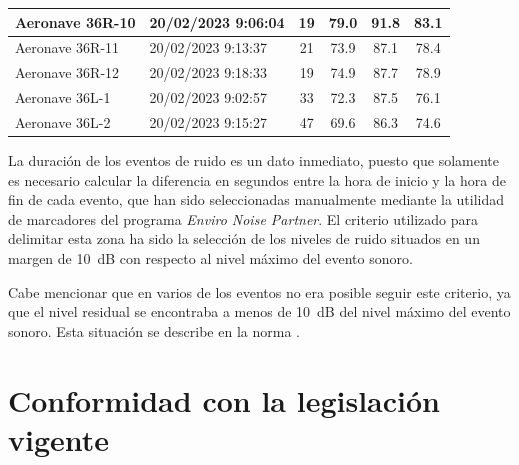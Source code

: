 \documentclass[11pt]{article}
\begin{document}
\begin{table}[htbp]
\begin{tabular}{|l|l|c|c|c|c|}
        \rowcolor[rgb]{ .867,  .922,  .969} Aeronave 36R-10 & 20/02/2023 9:06:04 & 19                 & 79.0        & 91.8     & 83.1       \\ \hline
        \rowcolor[rgb]{ .867,  .922,  .969} Aeronave 36R-11 & 20/02/2023 9:13:37 & 21                 & 73.9        & 87.1     & 78.4       \\ \hline
        \rowcolor[rgb]{ .867,  .922,  .969} Aeronave 36R-12 & 20/02/2023 9:18:33 & 19                 & 74.9        & 87.7     & 78.9       \\ \hline
        \rowcolor[rgb]{ .886,  .937,  .855} Aeronave 36L-1  & 20/02/2023 9:02:57 & 33                 & 72.3        & 87.5     & 76.1       \\ \hline
        \rowcolor[rgb]{ .886,  .937,  .855} Aeronave 36L-2  & 20/02/2023 9:15:27 & 47                 & 69.6        & 86.3     & 74.6       \\ \hline
    \end{tabular}
    \label{tab:indicadores}
\end{table}

La duración de los eventos de ruido es un dato inmediato, puesto que solamente es necesario calcular la diferencia en segundos entre la hora de inicio y la hora de fin de cada evento, que han sido seleccionadas manualmente mediante la utilidad de marcadores del programa \textit{Enviro Noise Partner}. El criterio utilizado para delimitar esta zona ha sido la selección de los niveles de ruido situados en un margen de \qty{10}{\dB} con respecto al nivel máximo del evento sonoro.

Cabe mencionar que en varios de los eventos no era posible seguir este criterio, ya que el nivel residual se encontraba a menos de \qty{10}{\dB} del nivel máximo del evento sonoro. Esta situación se describe en la norma \cite{ISO20906:2009}.



\section{Conformidad con la legislación vigente}


\nocite{*}
\newpage


\end{document}
